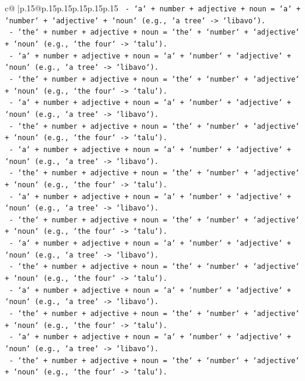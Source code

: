 \documentclass{article}
\begin{document}
{\begin{supertabular}{c@{$\;$}|p{.15\linewidth}@{}p{.15\linewidth}p{.15\linewidth}p{.15\linewidth}p{.15\linewidth}p{.15\linewidth}}
{{{\texttt{   {-} `a` + number + adjective + noun = `a` + `number` + `adjective` + `noun` (e.g., `a tree` {-}> `libavo`).} \\
\texttt{   {-} `the` + number + adjective + noun = `the` + `number` + `adjective` + `noun` (e.g., `the four` {-}> `talu`).} \\
\texttt{   {-} `a` + number + adjective + noun = `a` + `number` + `adjective` + `noun` (e.g., `a tree` {-}> `libavo`).} \\
\texttt{   {-} `the` + number + adjective + noun = `the` + `number` + `adjective` + `noun` (e.g., `the four` {-}> `talu`).} \\
\texttt{   {-} `a` + number + adjective + noun = `a` + `number` + `adjective` + `noun` (e.g., `a tree` {-}> `libavo`).} \\
\texttt{   {-} `the` + number + adjective + noun = `the` + `number` + `adjective` + `noun` (e.g., `the four` {-}> `talu`).} \\
\texttt{   {-} `a` + number + adjective + noun = `a` + `number` + `adjective` + `noun` (e.g., `a tree` {-}> `libavo`).} \\
\texttt{   {-} `the` + number + adjective + noun = `the` + `number` + `adjective` + `noun` (e.g., `the four` {-}> `talu`).} \\
\texttt{   {-} `a` + number + adjective + noun = `a` + `number` + `adjective` + `noun` (e.g., `a tree` {-}> `libavo`).} \\
\texttt{   {-} `the` + number + adjective + noun = `the` + `number` + `adjective` + `noun` (e.g., `the four` {-}> `talu`).} \\
\texttt{   {-} `a` + number + adjective + noun = `a` + `number` + `adjective` + `noun` (e.g., `a tree` {-}> `libavo`).} \\
\texttt{   {-} `the` + number + adjective + noun = `the` + `number` + `adjective` + `noun` (e.g., `the four` {-}> `talu`).} \\
\texttt{   {-} `a` + number + adjective + noun = `a` + `number` + `adjective` + `noun` (e.g., `a tree` {-}> `libavo`).} \\
\texttt{   {-} `the` + number + adjective + noun = `the` + `number` + `adjective` + `noun` (e.g., `the four` {-}> `talu`).} \\
\texttt{   {-} `a` + number + adjective + noun = `a` + `number` + `adjective` + `noun` (e.g., `a tree` {-}> `libavo`).} \\
\texttt{   {-} `the` + number + adjective + noun = `the` + `number` + `adjective` + `noun` (e.g., `the four` {-}> `talu`).} \\
}}}
\end{supertabular}}
\end{document}
